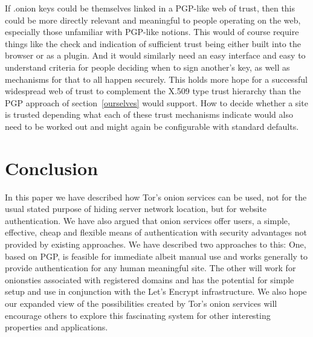 \documentclass[10pt, conference, compsocconf]{styles/IEEEtran}
\newcommand{\griffin}[1]{{\color{blue}\em (Griffin says: ``#1'')}}
\begin{document}
If .onion keys could be themselves linked in a PGP-like web of trust,
then this could be more directly relevant and meaningful to people
operating on the web, especially those unfamiliar with PGP-like
notions. This would of course require things like the check and
indication of sufficient trust being either built into the browser or
as a plugin. And it would similarly need an easy interface and easy to
understand criteria for people deciding when to sign another's key, as
well as mechanisms for that to all happen securely. This holds more
hope for a successful widespread web of trust to complement the X.509
type trust hierarchy than the PGP approach of section~\ref{ourselves}
would support. How to decide whether a site is trusted depending what
each of these trust mechanisms indicate would also need to be worked
out and might again be configurable with standard defaults.




\section{Conclusion}

In this paper we have described how Tor's onion services can be used,
not for the usual stated purpose of hiding server network location,
but for website authentication.  We have also argued that onion
services offer users, a simple, effective, cheap and flexible means of
authentication with security advantages not provided by existing
approaches. We have described two approaches to this: One, based on
PGP, is feasible for immediate albeit manual use and works generally
to provide authentication for any human meaningful site. The other
will work for onionsties associated with registered domains and has
the potential for simple setup and use in conjunction with the Let's
Encrypt infrastructure.  We also hope our expanded view of the
possibilities created by Tor's onion services will encourage others to
explore this fascinating system for other interesting properties and
applications.
\end{document}
